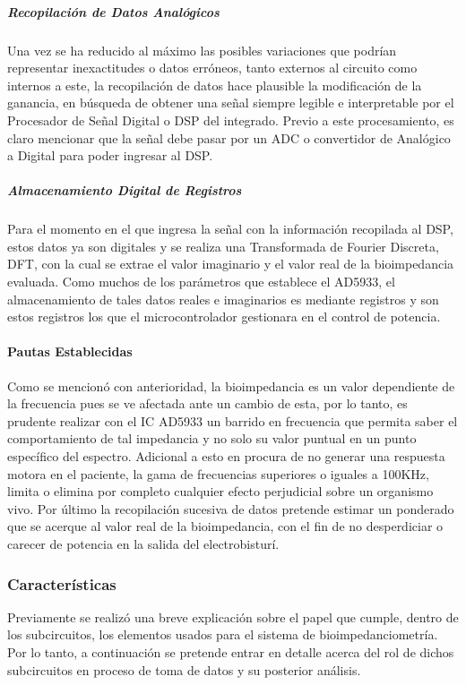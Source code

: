 \documentclass[12pt,letterpaper,spanish]{article}
\begin{document}
					\subparagraph{Recopilación de Datos Analógicos}
					\hfill\break				
Una vez se ha reducido al máximo las posibles variaciones que podrían representar inexactitudes o datos erróneos, tanto externos al circuito como internos a este, la recopilación de datos hace plausible la modificación de la ganancia, en búsqueda de obtener una señal siempre legible e interpretable por el Procesador de Señal Digital o DSP del integrado. Previo a este procesamiento, es claro mencionar que la señal debe pasar por un ADC  o convertidor de Analógico a Digital para poder ingresar al DSP.   

					\subparagraph{Almacenamiento Digital de Registros}
					\hfill\break
Para el momento en el que ingresa la señal con la información recopilada al DSP, estos datos ya son digitales y se realiza una Transformada de Fourier Discreta, DFT, con la cual se extrae el valor imaginario y el valor real de la bioimpedancia evaluada. Como muchos de los parámetros que establece el AD5933, el almacenamiento de tales datos reales e imaginarios es mediante registros y son estos registros los que el microcontrolador gestionara en el control de potencia.				

				\paragraph{Pautas Establecidas }
				\hfill\break								
Como se mencionó con anterioridad, la bioimpedancia es un valor dependiente de la frecuencia pues se ve afectada ante un cambio de esta, por lo tanto, es prudente realizar con el IC AD5933 un barrido en frecuencia que permita saber el comportamiento de tal impedancia y no solo su valor puntual en un punto específico del espectro. 
Adicional a esto en procura de no generar una respuesta motora en el paciente, la gama de frecuencias superiores o iguales a 100KHz, limita o elimina por completo cualquier efecto perjudicial sobre un organismo vivo. 
Por último la recopilación sucesiva de datos pretende estimar un ponderado que se acerque al valor real de la bioimpedancia, con el fin de no desperdiciar o carecer de potencia en la salida del electrobisturí. 

			\subsubsection{Características}
Previamente se realizó una breve explicación sobre el papel que cumple, dentro de los subcircuitos, los elementos usados para el sistema de bioimpedanciometría. Por lo tanto, a continuación se pretende entrar en detalle acerca del rol de dichos subcircuitos en proceso de toma de datos y su posterior análisis.  
\end{document}
